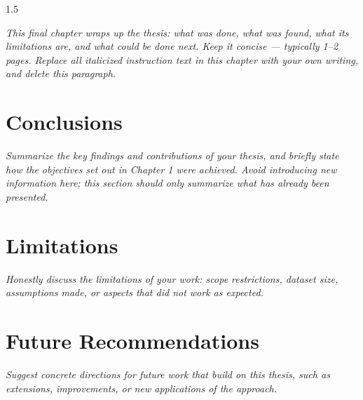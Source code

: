 \begin{spacing}{1.5}
\vspace{1cm}

\textit{This final chapter wraps up the thesis: what was done, what was found, what its limitations are, and what could be done next. Keep it concise — typically 1--2 pages. Replace all italicized instruction text in this chapter with your own writing, and delete this paragraph.}

\section{Conclusions}

\textit{Summarize the key findings and contributions of your thesis, and briefly state how the objectives set out in Chapter 1 were achieved. Avoid introducing new information here; this section should only summarize what has already been presented.}

\section{Limitations}

\textit{Honestly discuss the limitations of your work: scope restrictions, dataset size, assumptions made, or aspects that did not work as expected.}

\section{Future Recommendations}

\textit{Suggest concrete directions for future work that build on this thesis, such as extensions, improvements, or new applications of the approach.}

\end{spacing}
